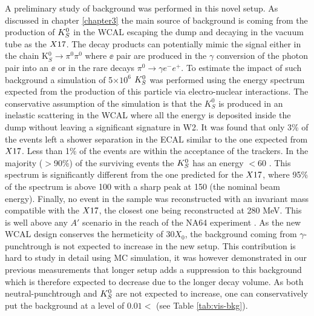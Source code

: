 A preliminary study of background was performed in this novel setup. As discussed in chapter \ref{chapter3} the main source of background is coming from the production of $K^0_S$ in the WCAL escaping the dump and decaying in the vacuum tube as the $X17$. The decay products can potentially mimic the signal either in the chain K$^0_S \rightarrow \pi^0 \pi^0$ where $\ee$ pair are produced in the $\gamma$ conversion of the photon pair into an $\ee$ or in the rare decays $\pi^0 \rightarrow \gamma e^- e^+$. To estimate the impact of such background a simulation of 5$\times 10^6$ $K^0_S$ was performed using the energy spectrum expected from the production of this particle via electro-nuclear interactions.
The conservative assumption of the simulation is that the $K^0_S$ is produced in an inelastic scattering in the WCAL where all the energy is deposited inside the dump without leaving a significant signature in W2. It was found that only 3\% of the events left a shower separation in the ECAL similar to the one expected from $X17$. Less than 1\% of the events are within the acceptance of the trackers. In the majority ($>$90\%) of the surviving events the $K^0_S$ has an energy $<$60 \gev. This spectrum is significantly different from the one predicted for the $X17$, where 95\% of the spectrum is above 100 \gev with a sharp peak at 150 \gev (the nominal beam energy). Finally, no event in the sample was reconstructed with an invariant mass compatible with the $X17$, the closest one being reconstructed at 280 MeV. This is well above any $A'$ scenario in the reach of the NA64 experiment \cite{Banerjee:2019hmi}. As the new WCAL design conserves the hermeticity of 30$X_0$, the background coming from $\gamma$-punchtrough is not expected to increase in the new setup. This contribution is hard to study in detail using MC simulation, it was however demonstrated in our previous measurements \cite{Banerjee:2019hmi} that longer setup adds a suppression to this background which is therefore expected to decrease due to the longer decay volume. As both neutral-punchtrough and $K^0_S$ are not expected to increase, one can conservatively put the background at a level of $0.01<$ (see Table \ref{tab:vis-bkg}).

